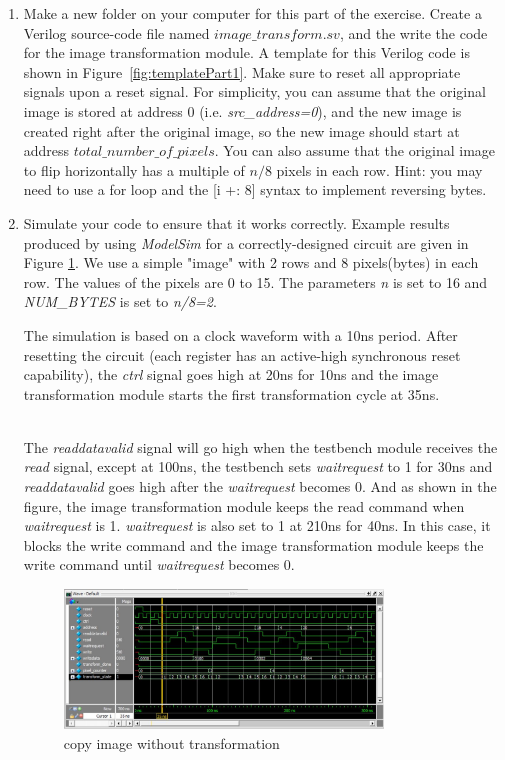 \documentclass[epsfig,10pt,fullpage]{article}
\begin{document}
\begin{enumerate}
    \item  Make a new folder on your computer for this part of the exercise. Create a Verilog source-code file named $image\_transform.sv$, and the write the code for the image transformation module. A template for this Verilog code is shown in Figure~\ref{fig:templatePart1}. Make sure to reset all appropriate signals upon a reset signal. For simplicity, you can assume that the original image is stored at address 0 (i.e. {\it src\_address=0}), and the new image is created right after the original image, so the new image should start at address $total\_number\_of\_pixels$. You can also assume that the original image to flip horizontally has a multiple of $n/8$ pixels in each row. Hint: you may need to use a for loop and the [i +: 8] syntax to implement reversing bytes.


    \item Simulate your code to ensure that it works correctly. Example results produced by using \emph{ModelSim} for a correctly-designed circuit are given in Figure \ref{fig:sim0}. We use a simple "image" with 2 rows and 8 pixels(bytes) in each row. The values of the pixels are 0 to 15. The parameters {\it n} is set to 16 and {\it NUM\_BYTES} is set to {\it n/8=2}.

    \newpage
    The simulation is based on a clock waveform with a 10ns period. After resetting the circuit (each register has an active-high synchronous reset capability), the \emph{ctrl} signal goes high at 20ns for 10ns and the image transformation module starts the first transformation cycle at 35ns.
    
    ~\\
    The \emph{readdatavalid} signal will go high when the testbench module receives the \emph{read} signal, except at 100ns, the testbench sets \emph{waitrequest} to 1 for 30ns and  \emph{readdatavalid} goes high after the \emph{waitrequest} becomes 0. And as shown in the figure, the image transformation module keeps the read command when \emph{waitrequest} is 1.  \emph{waitrequest} is also set to 1 at 210ns for 40ns. In this case, it blocks the write command and the image transformation module keeps the write command until \emph{waitrequest} becomes 0.\\
    
    \begin{figure}[h]
        \centering
        \includegraphics[width=0.8\textwidth]{figures/sim0.JPG}
        \caption{copy image without transformation}
        \label{fig:sim0}
    \end{figure}


\end{enumerate}
\end{document}
